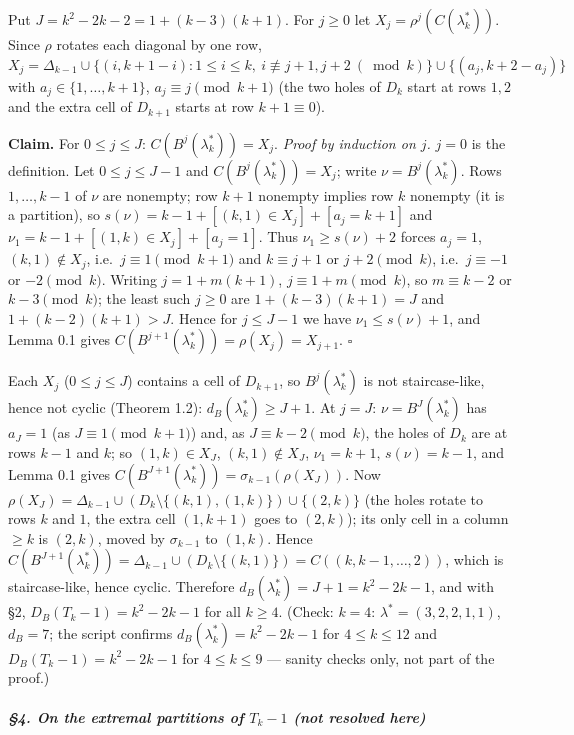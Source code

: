 Put \(J=k^2-2k-2=1+(k-3)(k+1)\). For \(j\ge0\) let
\(X_j=\rho^j(C(\lambda^*_k))\). Since \(\rho\) rotates each diagonal by
one row,
\(X_j=\Delta_{k-1}\cup\{(i,k+1-i):1\le i\le k,\ i\not\equiv j+1,j+2\ (\bmod k)\}\cup\{(a_j,k+2-a_j)\}\)
with \(a_j\in\{1,\dots,k+1\}\), \(a_j\equiv j\pmod{k+1}\) (the two holes
of \(D_k\) start at rows \(1,2\) and the extra cell of \(D_{k+1}\)
starts at row \(k+1\equiv0\)).

\textbf{Claim.} For \(0\le j\le J\): \(C(B^j(\lambda^*_k))=X_j\).
\emph{Proof by induction on \(j\).} \(j=0\) is the definition. Let
\(0\le j\le J-1\) and \(C(B^j(\lambda^*_k))=X_j\); write
\(\nu=B^j(\lambda^*_k)\). Rows \(1,\dots,k-1\) of \(\nu\) are nonempty;
row \(k+1\) nonempty implies row \(k\) nonempty (it is a partition), so
\(s(\nu)=k-1+[(k,1)\in X_j]+[a_j=k+1]\) and
\(\nu_1=k-1+[(1,k)\in X_j]+[a_j=1]\). Thus \(\nu_1\ge s(\nu)+2\) forces
\(a_j=1\), \((k,1)\notin X_j\), i.e.~\(j\equiv1\pmod{k+1}\) and
\(k\equiv j+1\) or \(j+2\pmod k\), i.e.~\(j\equiv-1\) or \(-2\pmod k\).
Writing \(j=1+m(k+1)\), \(j\equiv 1+m\pmod k\), so \(m\equiv k-2\) or
\(k-3\pmod k\); the least such \(j\ge0\) are \(1+(k-3)(k+1)=J\) and
\(1+(k-2)(k+1)>J\). Hence for \(j\le J-1\) we have
\(\nu_1\le s(\nu)+1\), and Lemma 0.1 gives
\(C(B^{j+1}(\lambda^*_k))=\rho(X_j)=X_{j+1}\). \(\square\)

Each \(X_j\) (\(0\le j\le J\)) contains a cell of \(D_{k+1}\), so
\(B^j(\lambda^*_k)\) is not staircase-like, hence not cyclic (Theorem
1.2): \(d_B(\lambda^*_k)\ge J+1\). At \(j=J\): \(\nu=B^J(\lambda^*_k)\)
has \(a_J=1\) (as \(J\equiv1\pmod{k+1}\)) and, as
\(J\equiv k-2\pmod k\), the holes of \(D_k\) are at rows \(k-1\) and
\(k\); so \((1,k)\in X_J\), \((k,1)\notin X_J\), \(\nu_1=k+1\),
\(s(\nu)=k-1\), and Lemma 0.1 gives
\(C(B^{J+1}(\lambda^*_k))=\sigma_{k-1}(\rho(X_J))\). Now
\(\rho(X_J)=\Delta_{k-1}\cup(D_k\setminus\{(k,1),(1,k)\})\cup\{(2,k)\}\)
(the holes rotate to rows \(k\) and \(1\), the extra cell \((1,k+1)\)
goes to \((2,k)\)); its only cell in a column \(\ge k\) is \((2,k)\),
moved by \(\sigma_{k-1}\) to \((1,k)\). Hence
\(C(B^{J+1}(\lambda^*_k))=\Delta_{k-1}\cup(D_k\setminus\{(k,1)\})=C((k,k-1,\dots,2))\),
which is staircase-like, hence cyclic. Therefore
\(d_B(\lambda^*_k)=J+1=k^2-2k-1\), and with §2, \(D_B(T_k-1)=k^2-2k-1\)
for all \(k\ge4\). (Check: \(k=4\): \(\lambda^*=(3,2,2,1,1)\),
\(d_B=7\); the script confirms \(d_B(\lambda^*_k)=k^2-2k-1\) for
\(4\le k\le12\) and \(D_B(T_k-1)=k^2-2k-1\) for \(4\le k\le9\) ---
sanity checks only, not part of the proof.)

\subparagraph{\texorpdfstring{§4. On the extremal partitions of
\(T_k-1\) (not resolved
here)}{§4. On the extremal partitions of T\_k-1 (not resolved here)}}\label{on-the-extremal-partitions-of-t_k-1-not-resolved-here}

